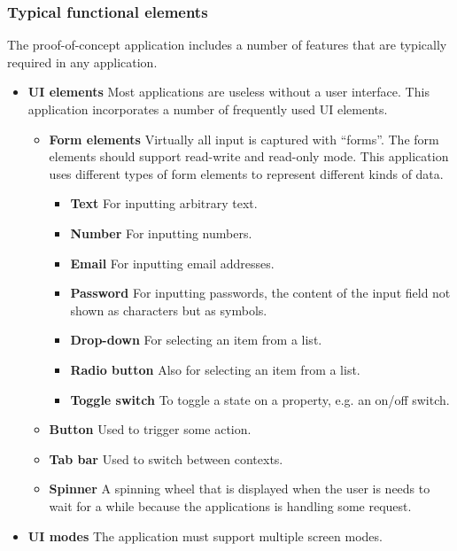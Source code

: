 \subsubsection{Typical functional elements}

The proof-of-concept application includes a number of features that are typically required in any application.

\begin{itemize}
    \item \textbf{UI elements} Most applications are useless without a user interface. This application incorporates a number of frequently used UI elements.
    \begin{itemize}
        \item \textbf{Form elements} Virtually all input is captured with ``forms''. The form elements should support read-write and read-only mode. This application uses different types of form elements to represent different kinds of data. 
        \begin{itemize}
            \item \textbf{Text} For inputting arbitrary text.
            \item \textbf{Number} For inputting numbers.
            \item \textbf{Email} For inputting email addresses.
            \item \textbf{Password} For inputting passwords, the content of the input field not shown as characters but as symbols. 
            \item \textbf{Drop-down} For selecting an item from a list.
            \item \textbf{Radio button} Also for selecting an item from a list.
            \item \textbf{Toggle switch} To toggle a state on a property, e.g. an on/off switch.
        \end{itemize}
        \item \textbf{Button} Used to trigger some action.
        \item \textbf{Tab bar} Used to switch between contexts.
        \item \textbf{Spinner} A spinning wheel that is displayed when the user is needs to wait for a while because the applications is handling some request.
    \end{itemize}
    \item \textbf{UI modes} The application must support multiple screen modes.
    \begin{itemize}

\end{itemize}
\end{itemize}
